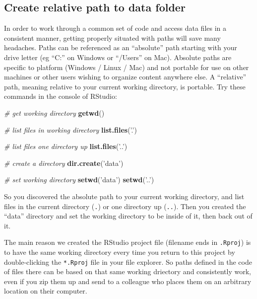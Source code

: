\documentclass[]{book}
\newenvironment{Shaded}{\begin{snugshade}}{\end{snugshade}}
\newcommand{\KeywordTok}[1]{\textcolor[rgb]{0.13,0.29,0.53}{\textbf{{#1}}}}
\newcommand{\StringTok}[1]{\textcolor[rgb]{0.31,0.60,0.02}{{#1}}}
\newcommand{\CommentTok}[1]{\textcolor[rgb]{0.56,0.35,0.01}{\textit{{#1}}}}
\newcommand{\NormalTok}[1]{{#1}}
\theoremstyle{definition}
\theoremstyle{definition}
\theoremstyle{definition}
\theoremstyle{remark}
\begin{document}
\subsection{Create relative path to data
folder}\label{create-relative-path-to-data-folder}

In order to work through a common set of code and access data files in a
consistent manner, getting properly situated with paths will save many
headaches. Paths can be referenced as an ``absolute'' path starting with
your drive letter (eg ``C:'' on Windows or ``/Users'' on Mac). Absolute
paths are specific to platform (Windows / Linux / Mac) and not portable
for use on other machines or other users wishing to organize content
anywhere else. A ``relative'' path, meaning relative to your current
working directory, is portable. Try these commands in the console of
RStudio:

\begin{Shaded}
\begin{Highlighting}[]
\CommentTok{# get working directory}
\KeywordTok{getwd}\NormalTok{()}

\CommentTok{# list files in working directory}
\KeywordTok{list.files}\NormalTok{(}\StringTok{'.'}\NormalTok{)}

\CommentTok{# list files one directory up}
\KeywordTok{list.files}\NormalTok{(}\StringTok{'..'}\NormalTok{)}

\CommentTok{# create a directory}
\KeywordTok{dir.create}\NormalTok{(}\StringTok{'data'}\NormalTok{)}

\CommentTok{# set working directory}
\KeywordTok{setwd}\NormalTok{(}\StringTok{'data'}\NormalTok{)}
\KeywordTok{setwd}\NormalTok{(}\StringTok{'..'}\NormalTok{)}
\end{Highlighting}
\end{Shaded}

So you discovered the absolute path to your current working directory,
and list files in the current directory (\texttt{.}) or one directory up
(\texttt{..}). Then you created the ``data'' directory and set the
working directory to be inside of it, then back out of it.

The main reason we created the RStudio project file (filename ends in
\texttt{.Rproj}) is to have the same working directory every time you
return to this project by double-clicking the \texttt{*.Rproj} file in
your file explorer. So paths defined in the code of files there can be
based on that same working driectory and consistently work, even if you
zip them up and send to a colleague who places them on an arbitrary
location on their computer.
\end{document}
